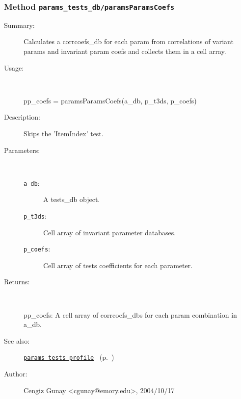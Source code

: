 \subsubsection[Method \texttt{paramsParamsCoefs}]{Method \texttt{params\_tests\_db/paramsParamsCoefs}}%
%
\label{ref_params_tests_db__paramsParamsCoefs}%
\hypertarget{ref_params_tests_db__paramsParamsCoefs}{}%
\begin{description}
\item[Summary:]Calculates a corrcoefs\_db for each param from correlations of variant params and invariant param coefs and collects them in a cell array.
%
\item[Usage:]~%
\begin{lyxcode}%
pp\_coefs = paramsParamsCoefs(a\_db, p\_t3ds, p\_coefs)
%
\end{lyxcode}%
%
\item[Description:]%
Skips the 'ItemIndex' test.
\item[Parameters:]~
\begin{description}%
\item[\texttt{a\_db}:]
 A tests\_db object.
\item[\texttt{p\_t3ds}:]
 Cell array of invariant parameter databases.
\item[\texttt{p\_coefs}:]
 Cell array of tests coefficients for each parameter.
\end{description}%
%
\item[Returns:]~

	pp\_coefs: A cell array of corrcoefs\_dbs for each param 
		  combination in a\_db.
%
%
\item[See also:]%
\hyperlink{ref_params_tests_profile}{\texttt{params\_tests\_profile}}%
\ (p.~\pageref{ref_params_tests_profile})%
%
%
\item[Author:]%
Cengiz Gunay <cgunay@emory.edu>, 2004/10/17%
\end{description}
\methodline%
